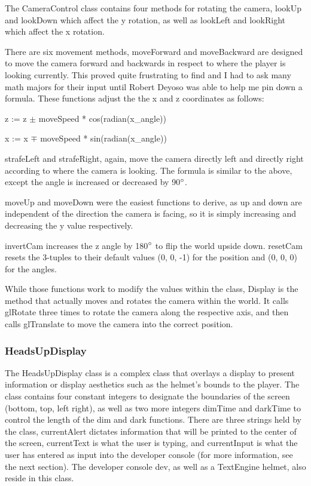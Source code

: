 \documentclass{article}
\begin{document}
The CameraControl class contains four methods for rotating the camera, lookUp and lookDown which affect the y rotation, as well as lookLeft and lookRight which affect the x rotation.

There are six movement methods, moveForward and moveBackward are designed to move the camera forward and backwards in respect to where the player is looking currently. This proved quite frustrating to find and I had to ask many math majors for their input until Robert Deyoso was able to help me pin down a formula. These functions adjust the the x and  z coordinates as follows:

z := z $\pm$ moveSpeed * cos(radian(x\_angle))

x := x $\mp$ moveSpeed * sin(radian(x\_angle))

strafeLeft and strafeRight, again, move the camera directly left and directly right according to where the camera is looking. The formula is similar to the above, except the angle is increased or decreased by 90$\degree$.

moveUp and moveDown were the easiest functions to derive, as up and down are independent of the direction the camera is facing, so it is simply increasing and decreasing the y value respectively. 

invertCam increases the z angle by 180$\degree$ to flip the world upside down.
resetCam resets the 3-tuples to their default values (0, 0, -1) for the position and (0, 0, 0) for the angles.

While those functions work to modify the values within the class, Display is the method that actually moves and rotates the camera within the world. It calls glRotate three times to rotate the camera along the respective axis, and then calls glTranslate to move the camera into the correct position.

\subsubsection{HeadsUpDisplay}

The HeadsUpDisplay class is a complex class that overlays a display to present information or display aesthetics such as the helmet's bounds to the player. The class contains four constant integers to designate the boundaries of the screen (bottom, top, left right), as well as two more integers dimTime and darkTime to control the length of the dim and dark functions. There are three strings held by the class, currentAlert dictates information that will be printed to the center of the screen, currentText is what the user is typing, and currentInput is what the user has entered as input into the developer console (for more information, see the next section). The developer console dev, as well as a TextEngine helmet, also reside in this class.
\end{document}
